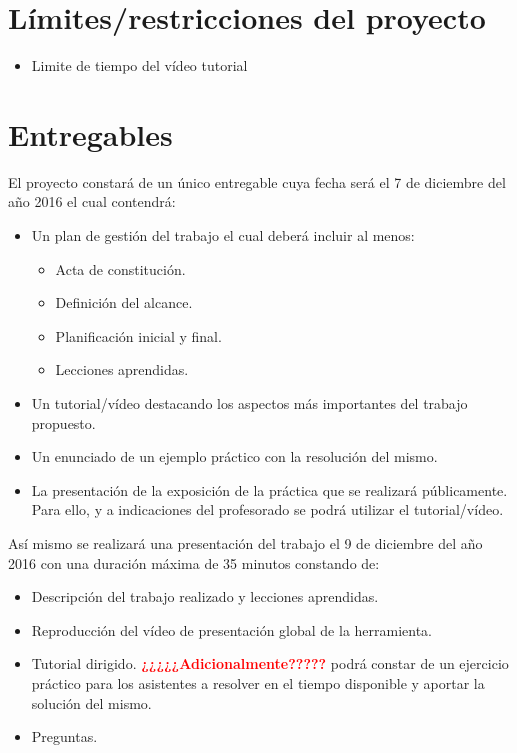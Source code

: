 \documentclass[a4paper,10pt]{scrartcl}
\begin{document}
\section{Límites/restricciones del proyecto}

\begin{itemize}
	\item Limite de tiempo del vídeo tutorial
\end{itemize}

\section{Entregables}

El proyecto constará de un único entregable cuya fecha será el 7 de diciembre del año 2016 el cual contendrá:
	\begin{itemize}
		\item Un plan de gestión del trabajo el cual deberá incluir al menos:
		
		\begin{itemize}
			\item Acta de constitución.
			\item Definición del alcance.
			\item Planificación inicial y final.
			\item Lecciones aprendidas.
		\end{itemize}
		
		\item Un tutorial/vídeo destacando los aspectos más importantes del trabajo propuesto.
		
		\item Un enunciado de un ejemplo práctico con la resolución del mismo.
		
		\item La presentación de la exposición de la práctica que se realizará públicamente. Para ello, y a indicaciones del profesorado se podrá utilizar el tutorial/vídeo.		
	\end{itemize}

Así mismo se realizará una presentación del trabajo el 9 de diciembre del año 2016 con una duración máxima de 35 minutos constando de:
\begin{itemize}
	\item Descripción del trabajo realizado y lecciones aprendidas.
	
	\item Reproducción del vídeo de presentación global de la herramienta.
	
	\item Tutorial dirigido. \textbf{\textcolor{red}{¿¿¿¿¿Adicionalmente?????}} podrá constar de un ejercicio práctico para los asistentes a resolver en el tiempo disponible y aportar la solución del mismo.

	\item Preguntas.


\end{itemize}
\end{document}
